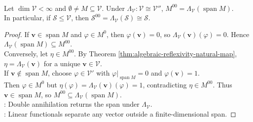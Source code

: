 \begin{theorem} \label{thm:double-annihilator-finite-dimensional} \\
Let $\dim\mathcal{V}<\infty$ and $\emptyset\neq M\subseteq\mathcal{V}$. Under $\Lambda_{\mathcal{V}}:\mathcal{V}\cong\mathcal{V}''$, $M^{00}=\Lambda_{\mathcal{V}}(\operatorname{span}M)$.\\
In particular, if $\mathcal{S}\leq\mathcal{V}$, then $\mathcal{S}^{00}=\Lambda_{\mathcal{V}}(\mathcal{S})\cong\mathcal{S}$.
\begin{proof}
If $\mathbf{v}\in\operatorname{span}M$ and $\varphi\in M^0$, then $\varphi(\mathbf{v})=0$, so $\Lambda_{\mathcal{V}}(\mathbf{v})(\varphi)=0$. Hence $\Lambda_{\mathcal{V}}(\operatorname{span}M)\subseteq M^{00}$.\\
Conversely, let $\eta\in M^{00}$. By Theorem \ref{thm:algebraic-reflexivity-natural-map}, $\eta=\Lambda_{\mathcal{V}}(\mathbf{v})$ for a unique $\mathbf{v}\in\mathcal{V}$.\\
If $\mathbf{v}\notin\operatorname{span}M$, choose $\varphi\in\mathcal{V}'$ with $\varphi|_{\operatorname{span}M}=0$ and $\varphi(\mathbf{v})=1$.\\
Then $\varphi\in M^0$ but $\eta(\varphi)=\Lambda_{\mathcal{V}}(\mathbf{v})(\varphi)=1$, contradicting $\eta\in M^{00}$. Thus $\mathbf{v}\in\operatorname{span}M$, so $M^{00}\subseteq\Lambda_{\mathcal{V}}(\operatorname{span}M)$.\\
: Double annihilation returns the span under $\Lambda_{\mathcal{V}}$.\\
: Linear functionals separate any vector outside a finite-dimensional span.
\end{proof}
\end{theorem}

